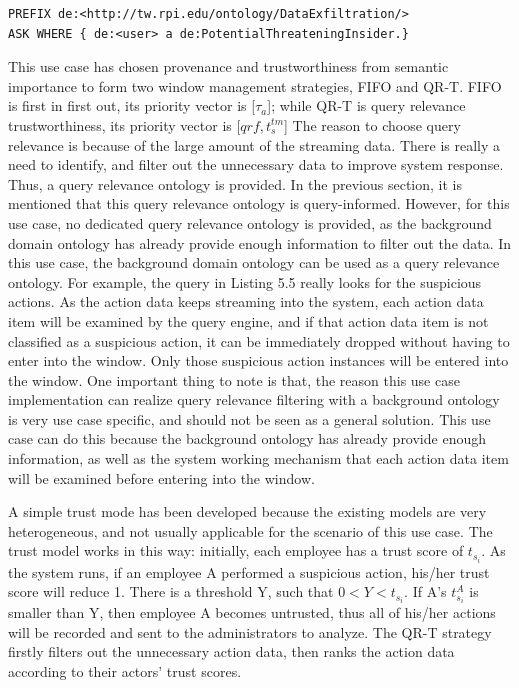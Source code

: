 \begin{lstlisting}[language=SPARQL, caption={Potential Malicious Insider Query},basicstyle=\small,frame=single]
PREFIX de:<http://tw.rpi.edu/ontology/DataExfiltration/>
ASK WHERE { de:<user> a de:PotentialThreateningInsider.}
\end{lstlisting}

This use case has chosen provenance and trustworthiness from semantic importance to form two window management strategies, FIFO and QR-T. 
FIFO is first in first out, its priority vector is [$\tau_{a}$]; 
while QR-T is query relevance trustworthiness, its priority vector is [$qrf, t^{tm}_{s}$]
The reason to choose query relevance is because of the large amount of the streaming data. 
There is really a need to identify, and filter out the unnecessary data to improve system response. 
Thus, a query relevance ontology is provided. 
In the previous section, it is mentioned that this query relevance ontology is query-informed.
However, for this use case, no dedicated query relevance ontology is provided, as the background domain ontology has already provide enough information to filter out the data. 
In this use case, the background domain ontology can be used as a query relevance ontology. 
For example, the query in Listing 5.5 really looks for the suspicious actions. 
As the action data keeps streaming into the system, each action data item will be examined by the query engine, and if that action data item is not classified as a suspicious action, it can be immediately dropped without having to enter into the window.
Only those suspicious action instances will be entered into the window. 
One important thing to note is that, the reason this use case implementation can realize query relevance filtering with a background ontology is very use case specific, and should not be seen as a general solution. 
This use case can do this because the background ontology has already provide enough information, as well as the system working mechanism that each action data item will be examined before entering into the window. 

A simple trust mode has been developed because the existing models are very heterogeneous, and not usually applicable for the scenario of this use case. 
The trust model works in this way: 
initially, each employee has a trust score of $t_{s_i}$. 
As the system runs, if an employee A performed a suspicious action, his/her trust score will reduce 1. 
There is a threshold Y, such that $0 < Y < t_{s_i}$. 
If A's $t^{A}_{s_i}$ is smaller than Y, then  employee A becomes untrusted, thus all of his/her actions will be recorded and sent to the administrators to analyze. 
The QR-T strategy firstly filters out the unnecessary action data, then ranks the action data according to their actors' trust scores. 
%
